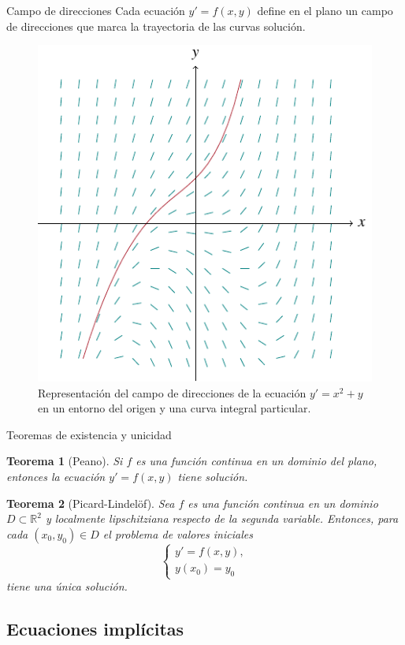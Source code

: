 \documentclass[10pt, spanish]{beamer}
\newtheorem{teorema}{Teorema}
\begin{document}
\begin{frame}{Campo de direcciones}
  Cada ecuación $y'=f(x,y)$ define en el plano un campo de direcciones que marca la trayectoria de las curvas solución.

  \begin{figure}
	\centering
	\includegraphics[width=.45\textwidth]{../figures/integral-curves-1}
	\caption{\footnotesize Representación del campo de direcciones de la ecuación $y'=x^2+y$ en un entorno del origen y una curva integral particular.}
\end{figure}
\end{frame}

\begin{frame}{Teoremas de existencia y unicidad}
\begin{teorema}[Peano]
  Si $f$ es una función continua en un dominio del plano, entonces la ecuación $y'=f(x,y)$ tiene solución.
\end{teorema}

\begin{teorema}[Picard-Lindelöf]
  Sea $f$ es una función continua en un dominio $D \subset \mathbb{R}^2$ y localmente lipschitziana respecto de la segunda variable. Entonces, para cada $(x_0,y_0)\in D$ el problema de valores iniciales
  \[
    \begin{cases}
      y'=f(x,y),\\
      y(x_0)=y_0
    \end{cases}
  \]
  tiene una única solución.
\end{teorema}
\end{frame}

\subsection{Ecuaciones implícitas}
\end{document}
